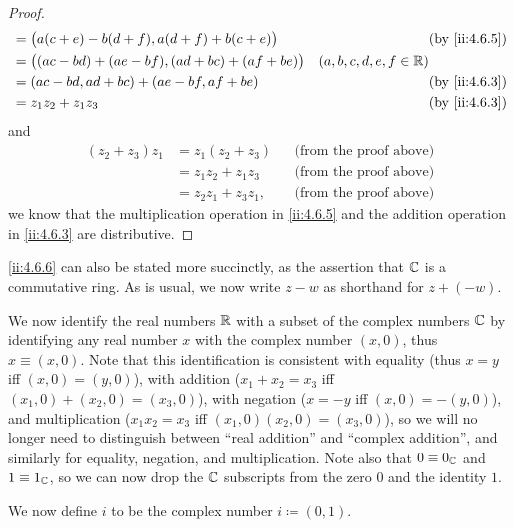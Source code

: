 \begin{proof}
\begin{align*}
                    & = \big(a (c + e) - b (d + f), a (d + f) + b (c + e)\big)  &                           & \by{ii:4.6.5} \\
                    & = \big((ac - bd) + (ae - bf), (ad + bc) + (af + be) \big) & (a, b, c, d, e, f \in \R)                 \\
                    & = (ac - bd, ad + bc) + (ae - bf, af + be)                 &                           & \by{ii:4.6.3} \\
                    & = z_1 z_2 + z_1 z_3                                       &                           & \by{ii:4.6.3}
  \end{align*}
  and
  \begin{align*}
    (z_2 + z_3) z_1 & = z_1 (z_2 + z_3)    &  & \text{(from the proof above)} \\
                    & = z_1 z_2 + z_1 z_3  &  & \text{(from the proof above)} \\
                    & = z_2 z_1 + z_3 z_1, &  & \text{(from the proof above)}
  \end{align*}
  we know that the multiplication operation in \cref{ii:4.6.5} and the addition operation in \cref{ii:4.6.3} are distributive.
\end{proof}

\begin{note}
  \cref{ii:4.6.6} can also be stated more succinctly, as the assertion that \(\mathbb{C}\) is a commutative ring.
  As is usual, we now write \(z - w\) as shorthand for \(z + (-w)\).
\end{note}

\begin{note}
  We now identify the real numbers \(\mathbb{R}\) with a subset of the complex numbers \(\mathbb{C}\) by identifying any real number \(x\) with the complex number \((x, 0)\), thus \(x \equiv (x, 0)\).
  Note that this identification is consistent with equality (thus \(x = y\) iff \((x, 0) = (y, 0)\)), with addition (\(x_1 + x_2 = x_3\) iff \((x_1, 0) + (x_2, 0) = (x_3, 0)\)), with negation (\(x = -y\) iff \((x, 0) = -(y, 0)\)), and multiplication (\(x_1 x_2 = x_3\) iff \((x_1, 0) (x_2, 0) = (x_3, 0)\)), so we will no longer need to distinguish between ``real addition'' and ``complex addition'', and similarly for equality, negation, and multiplication.
  Note also that \(0 \equiv 0_{\mathbb{C}}\) and \(1 \equiv 1_{\mathbb{C}}\), so we can now drop the \(\mathbb{C}\) subscripts from the zero \(0\) and the identity \(1\).
\end{note}

\begin{note}
  We now define \(i\) to be the complex number \(i \coloneqq (0, 1)\).
\end{note}

